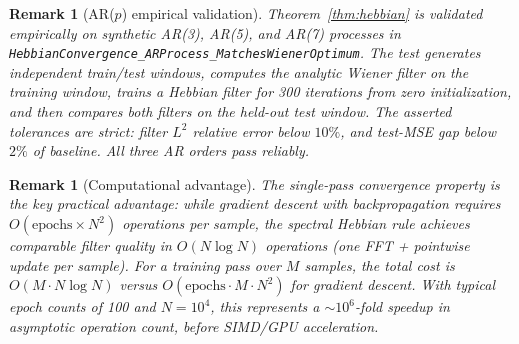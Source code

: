 \documentclass[11pt]{article}
\newtheorem{remark}[theorem]{Remark}
\begin{document}
\begin{remark}[AR($p$) empirical validation]
Theorem~\ref{thm:hebbian} is validated empirically on synthetic AR(3),
AR(5), and AR(7) processes in \texttt{HebbianConvergence\_ARProcess\_MatchesWienerOptimum}.
The test generates independent train/test windows, computes the analytic
Wiener filter on the training window, trains a Hebbian filter for 300
iterations from zero initialization, and then compares both filters on the
held-out test window. The asserted tolerances are strict: filter $L^2$
relative error below $10\%$, and test-MSE gap below $2\%$ of baseline.
All three AR orders pass reliably.
\end{remark}

\begin{remark}[Computational advantage]
The single-pass convergence property is the key practical advantage:
while gradient descent with backpropagation requires $O(\text{epochs} \times N^2)$
operations per sample, the spectral Hebbian rule achieves comparable filter
quality in $O(N \log N)$ operations (one FFT + pointwise update per sample).
For a training pass over $M$ samples, the total cost is
$O(M \cdot N \log N)$ versus $O(\text{epochs} \cdot M \cdot N^2)$
for gradient descent. With typical epoch counts of 100 and $N = 10^4$,
this represents a $\sim 10^6$-fold speedup in asymptotic operation count,
before SIMD/GPU acceleration.
\end{remark}
\end{document}
